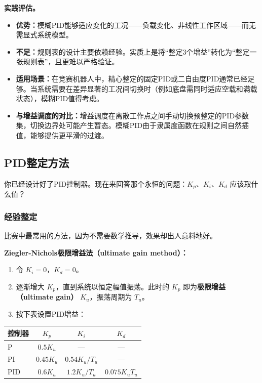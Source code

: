 \textbf{实践评估。}
\begin{itemize}
    \item \textbf{优势：}模糊PID能够适应变化的工况——负载变化、非线性工作区域——而无需显式系统模型。
    \item \textbf{不足：}规则表的设计主要依赖经验。实质上是将``整定3个增益''转化为``整定一张规则表''，且更难以严格验证。
    \item \textbf{适用场景：}在竞赛机器人中，精心整定的固定PID或二自由度PID通常已经足够。当系统需要在差异显著的工况间切换时（例如底盘需同时适应空载和满载状态），模糊PID值得考虑。
    \item \textbf{与增益调度的对比：}增益调度在离散工作点之间手动切换预整定的PID参数集，切换边界处可能产生暂态。模糊PID由于隶属度函数在规则之间自然插值，能够提供更平滑的过渡。
\end{itemize}

\subsection{PID整定方法}

你已经设计好了PID控制器。现在来回答那个永恒的问题：$K_p$、$K_i$、$K_d$ 应该取什么值？

\subsubsection{经验整定}

比赛中最常用的方法，因为不需要数学推导，效果却出人意料地好。

\textbf{Ziegler-Nichols极限增益法（ultimate gain method）：}
\begin{enumerate}
    \item 令 $K_i = 0$，$K_d = 0$。
    \item 逐渐增大 $K_p$，直到系统以恒定幅值振荡。此时的 $K_p$ 即为\textbf{极限增益（ultimate gain）} $K_u$，振荡周期为 $T_u$。
    \item 按下表设置PID增益：
\end{enumerate}

\begin{center}
\begin{tabular}{lccc}
\toprule
\textbf{控制器} & $K_p$ & $K_i$ & $K_d$ \\
\midrule
P & $0.5 K_u$ & --- & --- \\
PI & $0.45 K_u$ & $0.54 K_u / T_u$ & --- \\
PID & $0.6 K_u$ & $1.2 K_u / T_u$ & $0.075 K_u T_u$ \\
\bottomrule
\end{tabular}
\end{center}

